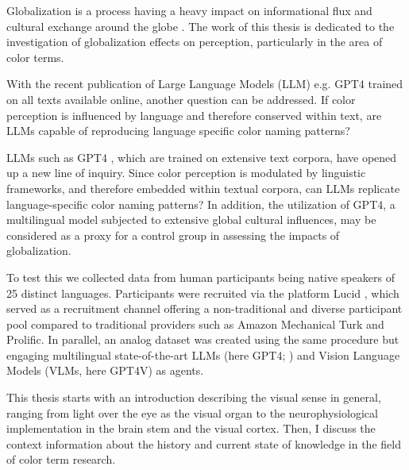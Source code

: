 Globalization is a process having a heavy impact on informational flux and cultural exchange around the globe \parencite{barrett2020towards, pieterse2019globalization}. The work of this thesis is dedicated to the investigation of globalization effects on perception, particularly in the area of color terms.

With the recent publication of Large Language Models (LLM) e.g. GPT4 \parencite{achiam2023gpt} trained on all texts available online, another question can be addressed. If color perception is influenced by language and therefore conserved within text, are LLMs capable of reproducing language specific color naming patterns?

LLMs such as GPT4 \parencite{achiam2023gpt}, which are trained on extensive text corpora, have opened up a new line of inquiry.
Since color perception is modulated by linguistic frameworks, and therefore embedded within textual corpora, can LLMs replicate language-specific color naming patterns?
In addition, the utilization of GPT4, a multilingual model subjected to extensive global cultural influences, may be considered as a proxy for a control group in assessing the impacts of globalization.

To test this we collected data from human participants being native speakers of 25 distinct languages. Participants were recruited via the platform Lucid \parencite{lucid2024} , which served as a recruitment channel offering a non-traditional and diverse participant pool compared to traditional providers such as Amazon Mechanical Turk and Prolific.
In parallel, an analog dataset was created using the same procedure but engaging multilingual state-of-the-art LLMs (here GPT4; \cite{achiam2023gpt}) and Vision Language Models (VLMs, here GPT4V) as agents.

This thesis starts with an introduction describing the visual sense in general, ranging from light over the eye as the visual organ to the neurophysiological implementation in the brain stem and the visual cortex.
Then, I discuss the context information about the history and current state of knowledge in the field of color term research.